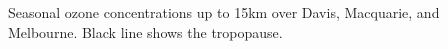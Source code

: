 \label{fig:sondeOzoneSeasons}

Seasonal ozone concentrations up to 15km over Davis, Macquarie, and Melbourne.
Black line shows the tropopause.